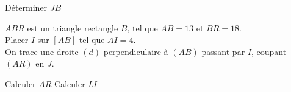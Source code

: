 \documentclass[../Cours.tex]{subfiles}
\begin{document}
\begin{questions}
    \question Déterminer $JB$


    $ABR$ est un triangle rectangle $B$, tel que $AB = 13$ et $BR = 18$. \\
    Placer $I$ sur $[AB]$ tel que $AI=4$. \\
    On trace une droite $(d)$ perpendiculaire à $(AB)$ passant par $I$, coupant $(AR)$ en $J$.

    \question Calculer $AR$
    \question Calculer $IJ$
\end{questions}
\end{document}

